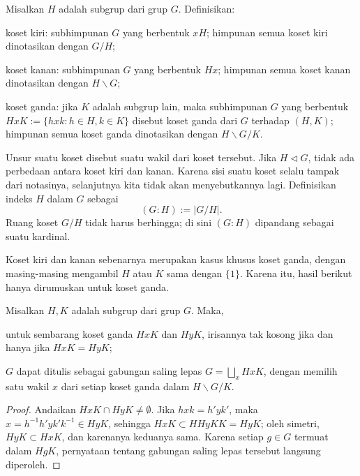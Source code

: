 \begin{definition}[Koset]\label{def:coset}
	Misalkan $H$ adalah subgrup dari grup $G$. Definisikan:
	\begin{compactitem}
		\item koset kiri: subhimpunan $G$ yang berbentuk $xH$; himpunan semua koset kiri dinotasikan dengan $G/H$;
		\item koset kanan: subhimpunan $G$ yang berbentuk $Hx$; himpunan semua koset kanan dinotasikan dengan $H \backslash G$;
		\item koset ganda: jika $K$ adalah subgrup lain, maka subhimpunan $G$ yang berbentuk $HxK:=\{hxk:h\in H,k\in K\}$ disebut koset ganda dari $G$ terhadap $(H,K)$; himpunan semua koset ganda dinotasikan dengan $H\backslash G/K$.
	\end{compactitem}
	Unsur suatu koset disebut suatu wakil dari koset tersebut. Jika $H\lhd G$, tidak ada perbedaan antara koset kiri dan kanan. Karena sisi suatu koset selalu tampak dari notasinya, selanjutnya kita tidak akan menyebutkannya lagi. Definisikan indeks $H$ dalam $G$ sebagai
	\[ (G:H) := |G/H|. \]
	Ruang koset $G/H$ tidak harus berhingga; di sini $(G:H)$ dipandang sebagai suatu kardinal. 
\end{definition}
Koset kiri dan kanan sebenarnya merupakan kasus khusus koset ganda, dengan masing-masing mengambil $H$ atau $K$ sama dengan $\{1\}$. Karena itu, hasil berikut hanya dirumuskan untuk koset ganda.
\begin{lemma}\label{prop:coset-decomp}
	Misalkan $H,K$ adalah subgrup dari grup $G$. Maka,
	\begin{compactenum}[(i)]
		\item untuk sembarang koset ganda $HxK$ dan $HyK$, irisannya tak kosong jika dan hanya jika $HxK=HyK$;
		\item $G$ dapat ditulis sebagai gabungan saling lepas $G=\bigsqcup_x HxK$, dengan memilih satu wakil $x$ dari setiap koset ganda dalam $H\backslash G/K$.
	\end{compactenum}
\end{lemma}
\begin{proof}
	Andaikan $HxK\cap HyK\neq\emptyset$. Jika $hxk=h'yk'$, maka $x=h^{-1}h'yk'k^{-1}\in HyK$, sehingga $HxK\subset HHyKK=HyK$; oleh simetri, $HyK\subset HxK$, dan karenanya keduanya sama. Karena setiap $g\in G$ termuat dalam $HgK$, pernyataan tentang gabungan saling lepas tersebut langsung diperoleh.
\end{proof}

